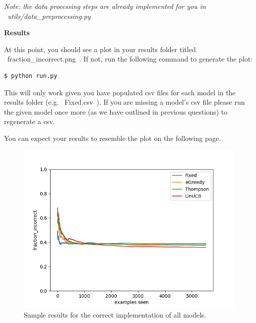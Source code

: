 \noindent \textit{Note: the data processing steps are already implemented for you in ~utils/data_preprocessing.py~}


\begin{enumerate}[(a)]

	

	

	

	

\end{enumerate}

\textbf{Results}

At this point, you should see a plot in your results folder titled ~fraction_incorrect.png~. If not, run the following command to generate the plot:
\begin{lstlisting}
$ python run.py
\end{lstlisting}
This will only work given you have populated csv files for each model in the results folder (e.g. ~Fixed.csv~). If you are missing a model's csv file please run the given model once more (as we have outlined in previous questions) to regenerate a csv.

You can expect your results to resemble the plot on the following page.
\begin{figure}[H]
\centering
  \includegraphics[width=.5\linewidth]{images/fraction_incorrect.png}
  \caption{Sample results for the correct implementation of all models.}
\end{figure}

\clearpage
